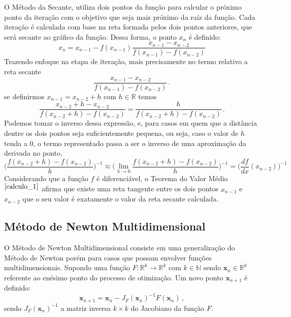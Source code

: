 O Método da Secante, utiliza dois pontos da função para calcular o próximo ponto da iteração com o objetivo que seja mais próximo da raíz da função. Cada iteração é calculada com base na reta formada pelos dois pontos anteriores, que será secante ao gráfico da função. Dessa forma, o ponto $x_n$ é definido:
%
\begin{equation}
  x_n = x_{n-1} - f(x_{n-1}) \frac{x_{n-1} - x_{n-2}}{f(x_{n-1}) - f(x_{n-2})}
\end{equation}
%
Trazendo enfoque na etapa de iteração, mais precisamente no termo relativo a reta secante
%
\begin{equation}
  \frac{x_{n-1} - x_{n-2}}{f(x_{n-1}) - f(x_{n-2})} \,.
\end{equation}
%
se definirmos $x_{n-1} = x_{n-2} + h$ com $h \in \mathds{R}$ temos
%
\begin{equation}
  \frac{x_{n-2} + h - x_{n-2}}{f(x_{n-2} + h) - f(x_{n-2})} = \frac{h}{f(x_{n-2} + h) - f(x_{n-2})} \,.
\end{equation}
%
Podemos tomar o inverso dessa expressão, e, para casos em quem que a distância dentre os dois pontos seja suficientemente pequena, ou seja, caso o valor de $h$ tenda a $0$, o termo representado passa a ser o inverso de uma aproximação da derivada no ponto.
%
\begin{equation}
  \Bigg( \frac{f(x_{n-2} + h) - f(x_{n-2})}{h} \Bigg)^{-1} \approx \Bigg( \lim\limits_{h\to0}\frac{f(x_{n-2}+h)-f(x_{n-2})}{h} \Bigg)^{-1} = \Bigg( \frac{df}{dx}(x_{n-2}) \Bigg)^{-1}
\end{equation}
%
Considerando que a função $f$ é diferenciável, o Teorema do Valor Médio$^{ \cite{calculo_1} }$ afirma que existe uma reta tangente entre os dois pontos $x_{n-1}$ e $x_{n-2}$ que o seu valor é exatamente o valor da reta secante calculada.

\subsection{Método de Newton Multidimensional}

O Método de Newton Multidimensional consiste em uma generalização do Método de Newton porém para casos que possam envolver funções multidimensionais. Supondo uma função $F: {\mathds{R}^k\to\mathds{R}^k}$ com $k \in \mathds{N}$ sendo $\mathbf{x}_n \in \mathds{R}^k$ referente ao enésimo ponto do processo de otimização. Um novo ponto $\mathbf{x}_{n+1}$ é definido:
%
\begin{equation}
  \label{eq:newton_generalization}
  \mathbf{x}_{n+1} = \mathbf{x}_n - J_F(\mathbf{x}_n)^{-1}F(\mathbf{x}_n) \,,
\end{equation}
%
sendo $J_F(\mathbf{x}_n)^{-1}$ a matriz inversa $k \times k$ do Jacobiano da função $F$.

